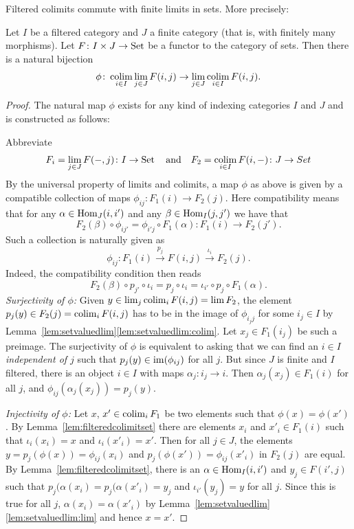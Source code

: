 \documentclass[a4paper,openany]{scrbook}
\begin{document}
\begin{lemma} \label{lemma:filteredcolimfinitelim}
Filtered colimits commute with finite limits in sets. More precisely:

Let $I$ be a filtered category and $J$ a finite category (that is, with finitely many morphisms). Let $F\colon I \times J \to \operatorname{Set}$ be a functor to the category of sets. Then there is a natural bijection
\[
\phi\colon \colim_{i \in I} \lim_{j \in J} F(i,j) \to \lim_{j \in J} \colim_{i \in I} F(i,j).
\]
\end{lemma}
\begin{proof}
The natural map $\phi$ exists for any kind of indexing categories $I$ and $J$ and is constructed as follows:

Abbreviate
\[
F_i = \lim_{j \in J} F(-,j)\colon I \to \Set \quad\text{and}\quad F_2 = \colim_{i \in I} F(i,-)\colon J \to Set
\]
By the universal property of limits and colimits, a map $\phi$ as above is given by a compatible collection of maps $\phi_{ij}\colon F_1(i) \to F_2(j)$. Here compatibility means that for any $\alpha\in \operatorname{Hom}_J(i,i')$ and any $\beta\in \operatorname{Hom}_I(j,j')$ we have that
\[
F_2(\beta) \circ \phi_{ij'} = \phi_{i'j} \circ F_1(\alpha)\colon F_1(i) \to F_2(j').
\]
Such a collection is naturally given as
\[
\phi_{ij}\colon F_1(i) \xrightarrow{p_j} F(i,j) \xrightarrow{\iota_i} F_2(j).
\]
Indeed, the compatibility condition then reads
\[
F_2(\beta) \circ p_{j'} \circ \iota_i = p_j \circ \iota_i = \iota_{i'} \circ p_j \circ F_1(\alpha).
\]
\emph{Surjectivity of $\phi$:} Given $y \in \lim_j \colim_i F(i,j) = \lim F_2$, the element $p_j(y) \in F_2(j) = \colim_i F(i,j)$ has to be in the image of $\phi_{i_jj}$ for some $i_j \in I$ by Lemma~\ref{lem:setvaluedlim}\eqref{lem:setvaluedlim:colim}. Let $x_j \in F_1(i_j)$ be such a preimage. The surjectivity of $\phi$ is equivalent to asking that we can find an $i \in I$ \emph{independent of $j$} such that $p_j(y) \in \operatorname{im}(\phi_{ij})$ for all $j$. But since $J$ is finite and $I$ filtered, there is an object $i \in I$ with maps $\alpha_j \colon i_j \to i$. Then $\alpha_j(x_j) \in F_1(i)$ for all $j$, and $\phi_{ij}(\alpha_j(x_j)) = p_j(y)$.

\emph{Injectivity of $\phi$:} Let $x$, $x' \in \colim_i F_1$ be two elements such that $\phi(x) = \phi(x')$. By Lemma~\ref{lem:filteredcolimitset} there are elements $x_i$ and $x'_i \in F_1(i)$ such that $\iota_i(x_i) = x$ and $\iota_i(x'_i) = x'$. Then for all $j \in J$, the elements $y = p_j(\phi(x)) = \phi_{ij}(x_i)$ and $p_j(\phi(x')) = \phi_{ij}(x'_i)$ in $F_2(j)$ are equal. By Lemma~\ref{lem:filteredcolimitset}, there is an $\alpha \in \operatorname{Hom}_I(i,i')$ and $y_j \in F(i',j)$ such that $p_j(\alpha(x_i) = p_j(\alpha(x'_i) = y_j$ and $\iota_{i'}(y_j) = y$ for all $j$. Since this is true for all $j$, $\alpha(x_i) = \alpha(x'_i)$ by Lemma~\ref{lem:setvaluedlim}\eqref{lem:setvaluedlim:lim} and hence $x=x'$.
\end{proof}
\end{document}
